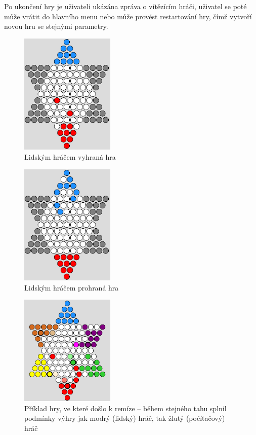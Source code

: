 Po ukončení hry je uživateli ukázána zpráva o vítězícím hráči, uživatel se poté může vrátit do hlavního menu nebo může provést restartování hry, čímž vytvoří novou hru se stejnými parametry.

\begin{figure}
	\centering
	\includegraphics[width=0.4\textwidth]{Figures/Vyhra.png}
	\caption{Lidským hráčem vyhraná hra}
    \label{fig:Vyhra}
\end{figure}

\begin{figure}
	\centering
	\includegraphics[width=0.4\textwidth]{Figures/Prohra.png}
	\caption{Lidským hráčem prohraná hra}
    \label{fig:Prohra}
\end{figure}

\begin{figure}
	\centering
	\includegraphics[width=0.4\textwidth]{Figures/Remiza.png}
	\caption[Příklad hry, ve které došlo k remíze]{Příklad hry, ve které došlo k remíze – během stejného tahu splnil podmínky výhry jak modrý (lidský) hráč, tak žlutý (počítačový) hráč}
    \label{fig:Remiza}
\end{figure}

